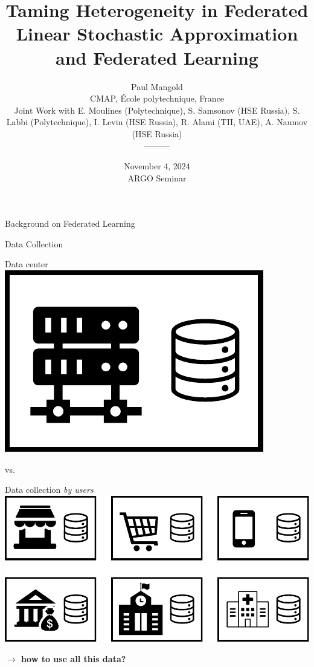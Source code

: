 \documentclass[aspectratio=169,14pt]{beamer}
\title{\LARGE Taming Heterogeneity in Federated Linear Stochastic Approximation and Federated Learning
\vspace{-0.5em}}
\author{
  \vspace{-0.5em}
  Paul Mangold\\[0.5em]
  CMAP, École polytechnique, France\\[0.5em]
  \footnotesize Joint Work with E. Moulines (Polytechnique), S. Samsonov (HSE Russia), S. Labbi (Polytechnique), I. Levin (HSE Russia), R. Alami (TII, UAE), A. Naumov (HSE Russia)
  \\
  ---------\\
  \vspace{-2.5em}
}
\institute{}
\date{November 4, 2024 \\
ARGO Seminar}
\begin{document}

\begin{frame}[plain]
  \vspace{1.5em}
  \titlepage
\end{frame}
\addtocounter{framenumber}{-1}

\begin{frame}
  \begin{center}
    \textcolor{beamer@blendedblue}{
      \huge Background on Federated Learning
    }
  \end{center}
\end{frame}

\begin{frame}{Data Collection}
  \hspace{-3em}
  \begin{minipage}{0.5\linewidth}
    \begin{center}
      Data center\\[0.5em]
      
      \includegraphics[width=0.4\linewidth]{images/central.pdf}
    \end{center}
    
  \end{minipage}\pause vs.\hspace{1.5em}%
  \begin{minipage}{0.5\linewidth}
    \pause
    \begin{center}
      Data collection \emph{by users} \\[0.5em]
      
      \includegraphics[width=0.8\linewidth]{images/decentralized.pdf}
    \end{center}
  \end{minipage}

  \vspace{1em}

  \pause
  
  \begin{center}
    \textbf{
    $\rightarrow$ how to use all this data?}
  \end{center}
\end{frame}
\end{document}
